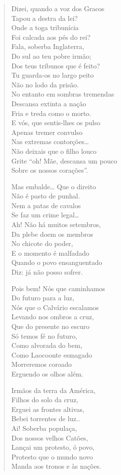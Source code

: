 \begin{verse}
Dizei, quando a voz dos Gracos \\
Tapou a destra da lei? \\
Onde a toga tribunícia \\
Foi calcada aos pés do rei? \\
Fala, soberba Inglaterra, \\
Do sul ao teu pobre irmão; \\
Dos teus tribunos que é feito? \\
Tu guarda-os no largo peito \\
Não no lodo da prisão. \\
No entanto em sombras tremendas\\
Descansa extinta a nação \\
Fria e treda como o morto. \\
E vós, que sentis-lhes os pulso \\
Apenas tremer convulso \\
Nas extremas contorções… \\
Não deixais que o filho louco \\
Grite “oh! Mãe, descansa um pouco \\
Sobre os nossos corações”. 
						
Mas embalde… Que o direito \\
Não é pasto de punhal. \\
Nem a patas de cavalos \\
Se faz um crime legal… \\
Ah! Não há muitos setembros, \\
Da plebe doem os membros \\
No chicote do poder, \\
E o momento é malfadado \\ 
Quando o povo ensanguentado \\
Diz: já não posso sofrer.
					
Pois bem! Nós que caminhamos \\
Do futuro para a luz, \\
Nós que o Calvário escalamos \\
Levando nos ombros a cruz, \\
Que do presente no escuro \\
Só temos fé no futuro, \\
Como alvorada do bem, \\
Como Laocoonte esmagado \\
Morreremos coroado \\
Erguendo os olhos além. 
					
Irmãos da terra da América, \\
Filhos do solo da cruz, \\
Erguei as frontes altivas, \\
Bebei torrentes de luz..\\
Ai! Soberba populaça, \\
Dos nossos velhos Catões, \\
Lançai um protesto, ó povo, \\
Protesto que o mundo novo \\
Manda aos tronos e às nações.
\end{verse}

